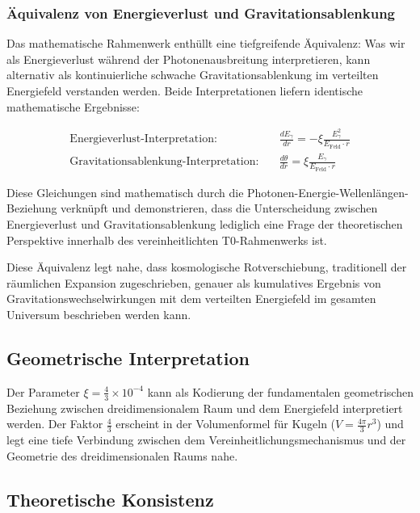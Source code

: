 \documentclass[12pt,a4paper]{article}
\newcommand{\efield}{E_{\text{Feld}}}
\theoremstyle{definition}
\begin{document}
	\subsubsection{\"Aquivalenz von Energieverlust und Gravitationsablenkung}
	
	Das mathematische Rahmenwerk enth\"ullt eine tiefgreifende \"Aquivalenz: Was wir als Energieverlust w\"ahrend der Photonenausbreitung interpretieren, kann alternativ als kontinuierliche schwache Gravitationsablenkung im verteilten Energiefeld verstanden werden. Beide Interpretationen liefern identische mathematische Ergebnisse:
	
	\begin{align}
		\text{Energieverlust-Interpretation:} \quad &\frac{dE_\gamma}{dr} = -\xi \frac{E_\gamma^2}{\efield \cdot r} \\
		\text{Gravitationsablenkung-Interpretation:} \quad &\frac{d\theta}{dr} = \xi \frac{E_\gamma}{\efield \cdot r}
	\end{align}
	
	Diese Gleichungen sind mathematisch durch die Photonen-Energie-Wellenl\"angen-Beziehung verkn\"upft und demonstrieren, dass die Unterscheidung zwischen Energieverlust und Gravitationsablenkung lediglich eine Frage der theoretischen Perspektive innerhalb des vereinheitlichten T0-Rahmenwerks ist.
	
	Diese \"Aquivalenz legt nahe, dass kosmologische Rotverschiebung, traditionell der r\"aumlichen Expansion zugeschrieben, genauer als kumulatives Ergebnis von Gravitationswechselwirkungen mit dem verteilten Energiefeld im gesamten Universum beschrieben werden kann.
	
	\subsection{Geometrische Interpretation}
	
	Der Parameter $\xi = \frac{4}{3} \times 10^{-4}$ kann als Kodierung der fundamentalen geometrischen Beziehung zwischen dreidimensionalem Raum und dem Energiefeld interpretiert werden. Der Faktor $\frac{4}{3}$ erscheint in der Volumenformel f\"ur Kugeln ($V = \frac{4\pi}{3}r^3$) und legt eine tiefe Verbindung zwischen dem Vereinheitlichungsmechanismus und der Geometrie des dreidimensionalen Raums nahe.
	
	\subsection{Theoretische Konsistenz}
	
\end{document}
